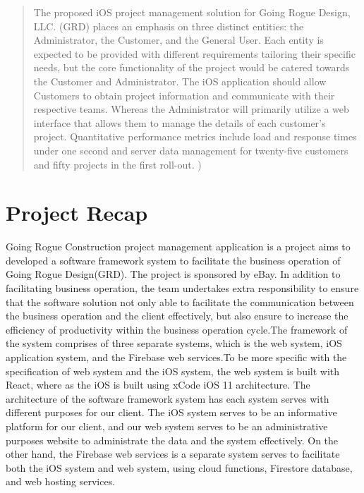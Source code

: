 \documentclass[onecolumn, draftclsnofoot,10pt, compsoc]{IEEEtran}
\begin{document}
\begin{titlepage}
\begin{singlespace}
{        }
        \begin{abstract}
       The proposed iOS project management solution for Going Rogue Design, LLC. (GRD) places an emphasis on three distinct entities: the Administrator, the Customer, and the General User. Each entity is expected to be provided with different requirements tailoring their specific needs, but the core functionality of the project would be catered towards the Customer and Administrator. The iOS application should allow Customers to obtain project information and communicate with their respective teams. Whereas the Administrator will primarily utilize a web interface that allows them to manage the details of each customer’s project. Quantitative performance metrics include load and response times under one second and server data management for twenty-five customers and fifty projects in the first roll-out. )
        \end{abstract}     
    \end{singlespace}
\end{titlepage}
\newpage
{}
\tableofcontents
\clearpage

\section{Project Recap}

Going Rogue Construction project management application is a project aims to developed a software framework system to facilitate the business operation of Going Rogue Design(GRD). The project is sponsored by eBay. In addition to facilitating business operation, the team undertakes extra responsibility to ensure that the software solution not only able to facilitate the communication between the business operation and the client effectively, but also ensure to increase the efficiency of productivity within the business operation cycle.The framework of the system comprises of three separate systems, which is the web system, iOS application system, and the Firebase web services.To be more specific with the specification of web system and the iOS system, the web system is built with React, where as the iOS is built using xCode iOS 11 architecture. The architecture of the software framework system has each system serves with different purposes for our client. The iOS system serves to be an informative platform for our client, and our web system serves to be an administrative purposes website to administrate the data and the system effectively. On the other hand, the Firebase web services is a separate system serves to facilitate both the iOS system and web system, using cloud functions, Firestore database, and web hosting services. \newline
\end{document}
